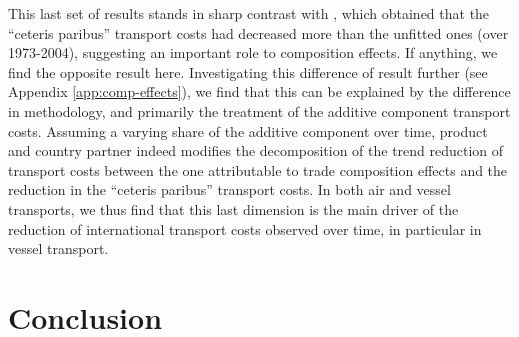 \documentclass[a4paper,11pt]{article}
\begin{document}
This last set of results stands in sharp contrast with \citet{hummels2007}, which obtained that the ``ceteris paribus'' transport costs had decreased more than the unfitted ones (over 1973-2004), suggesting an important role to composition effects. If anything, we find the opposite result here. Investigating this difference of result further (see Appendix \ref{app:comp-effects}), we find that this can be explained by the difference in methodology, and primarily the treatment of the additive component transport costs. Assuming a varying share of the additive component over time, product and country partner indeed modifies the decomposition of the trend reduction of transport costs between the one attributable to trade composition effects and the reduction in the ``ceteris paribus'' transport costs. In both air and vessel transports, we thus find that this last dimension is the main driver of the reduction of international transport costs observed over time, in particular in vessel transport.












\section{Conclusion \label{sec:conclu}}
\end{document}
